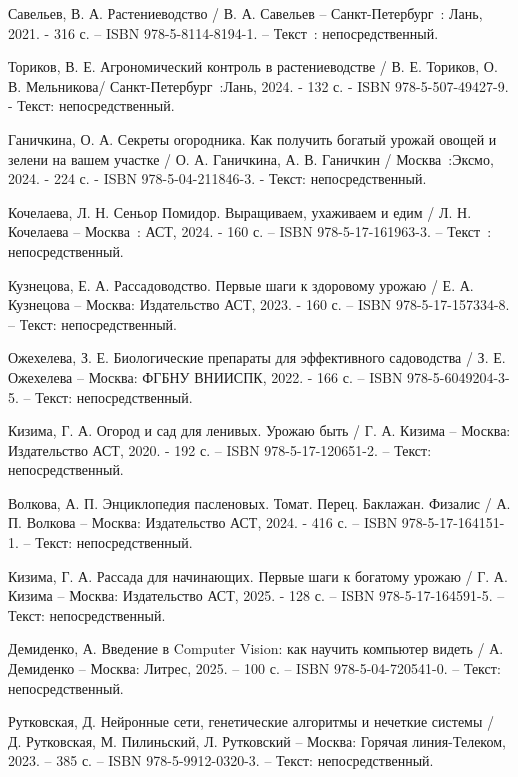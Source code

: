 \begin{thebibliography}{9}
	Савельев, В. А. Растениеводство / В. А. Савельев  – Санкт-Петербург~: Лань, 2021. - 316 с. – ISBN 978-5-8114-8194-1. – Текст~: непосредственный.	
	
	 Ториков, В. Е. Агрономический контроль в растениеводстве / В. Е. Ториков, О. В. Мельникова/ Санкт-Петербург~:Лань, 2024. - 132 с. - ISBN 978-5-507-49427-9. - Текст: непосредственный.
	
	 Ганичкина, О. А. Секреты огородника. Как получить богатый урожай овощей и зелени на вашем участке / О. А. Ганичкина, А. В. Ганичкин  / Москва~:Эксмо, 2024. - 224 с. - ISBN 978-5-04-211846-3. - Текст: непосредственный.
	
	 Кочелаева, Л. Н. Сеньор Помидор. Выращиваем, ухаживаем и едим / Л. Н. Кочелаева  – Москва~: АСТ, 2024. - 160 с. – ISBN 978-5-17-161963-3. – Текст~: непосредственный.	
	
	 Кузнецова, Е. А. Рассадоводство. Первые шаги к здоровому урожаю / Е. А. Кузнецова – Москва: Издательство АСТ, 2023. - 160 с. – ISBN 978-5-17-157334-8. – Текст: непосредственный.
	
	 Ожехелева, З. Е. Биологические препараты для эффективного садоводства / З. Е. Ожехелева – Москва: ФГБНУ ВНИИСПК, 2022. - 166 с. – ISBN 978-5-6049204-3-5. – Текст: непосредственный.
	
	 Кизима, Г. А. Огород и сад для ленивых. Урожаю быть / Г. А. Кизима – Москва: Издательство АСТ, 2020. - 192 с. – ISBN 978-5-17-120651-2. – Текст: непосредственный.
	
	 Волкова, А. П. Энциклопедия пасленовых. Томат. Перец. Баклажан. Физалис / А. П. Волкова – Москва: Издательство АСТ, 2024. - 416 с. – ISBN 978-5-17-164151-1. – Текст: непосредственный.
	
	 Кизима, Г. А. Рассада для начинающих. Первые шаги к богатому урожаю / Г. А. Кизима – Москва: Издательство АСТ, 2025. - 128 с. – ISBN 978-5-17-164591-5. – Текст: непосредственный.
	
	 Демиденко, А. Введение в Computer Vision: как научить компьютер видеть / А. Демиденко – Москва: Литрес, 2025. – 100 с. – ISBN 978-5-04-720541-0. – Текст: непосредственный.
	
	 Рутковская, Д. Нейронные сети, генетические алгоритмы и нечеткие системы / Д. Рутковская, М. Пилиньский, Л. Рутковский – Москва: Горячая линия-Телеком, 2023. – 385 с. – ISBN 978-5-9912-0320-3. – Текст: непосредственный.
	

\end{thebibliography}
